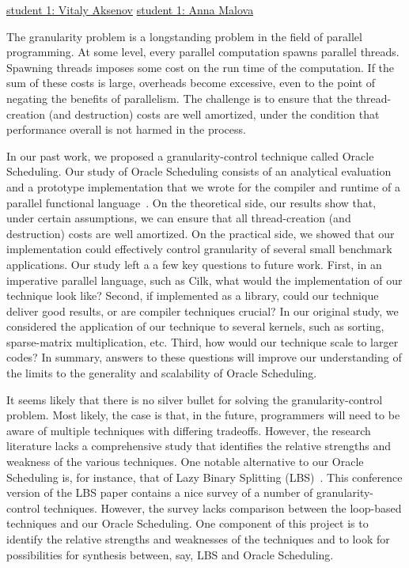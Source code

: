 \documentclass[11pt]{article}
\newcommand{\email}[2]{\href{mailto:#2}{#1}}
\begin{document}
\email{student 1: Vitaly Aksenov}{aksenov.vitaly@gmail.com}
\email{student 1: Anna Malova}{an.forgottenn@gmail.com}

The granularity problem is a longstanding problem in the field of
parallel programming.  At some level, every parallel computation
spawns parallel threads.  Spawning threads imposes some cost on the
run time of the computation.  If the sum of these costs is large,
overheads become excessive, even to the point of negating the benefits
of parallelism.  The challenge is to ensure that the thread-creation
(and destruction) costs are well amortized, under the condition that
performance overall is not harmed in the process.

In our past work, we proposed a granularity-control technique called
Oracle Scheduling.  Our study of Oracle Scheduling consists of an
analytical evaluation and a prototype implementation that we wrote for
the compiler and runtime of a parallel functional
language~\cite{AcarChRa11}.  On the theoretical side, our results show
that, under certain assumptions, we can ensure that all
thread-creation (and destruction) costs are well amortized.  On the
practical side, we showed that our implementation could effectively
control granularity of several small benchmark applications.  Our
study left a a few key questions to future work.  First, in an
imperative parallel language, such as Cilk, what would the
implementation of our technique look like?  Second, if implemented as
a library, could our technique deliver good results, or are compiler
techniques crucial?  In our original study, we considered the
application of our technique to several kernels, such as sorting,
sparse-matrix multiplication, etc.  Third, how would our technique
scale to larger codes?  In summary, answers to these questions will
improve our understanding of the limits to the generality and
scalability of Oracle Scheduling.

It seems likely that there is no silver bullet for solving the
granularity-control problem.  Most likely, the case is that, in the
future, programmers will need to be aware of multiple techniques with
differing tradeoffs.  However, the research literature lacks a
comprehensive study that identifies the relative strengths and
weakness of the various techniques.  One notable alternative to our
Oracle Scheduling is, for instance, that of Lazy Binary Splitting
(LBS)~\cite{lazy-binary-splitting,JFP:8669069}.  This conference
version of the LBS paper contains a nice survey of a number of
granularity-control techniques.  However, the survey lacks comparison
between the loop-based techniques and our Oracle Scheduling.  One
component of this project is to identify the relative strengths and
weaknesses of the techniques and to look for possibilities for
synthesis between, say, LBS and Oracle Scheduling.
\end{document}
